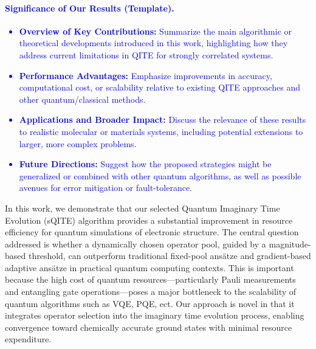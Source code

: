 \documentclass[aip,jcp,amsmath,amssymb, reprint]{revtex4-1}
\newcommand{\note}[2]{%
  \ifthenelse{\boolean{shownotes}}%
    {\textcolor{#1}{#2}}%
    {}%
}
\begin{document}
\note{blue}{
\paragraph{Significance of Our Results (Template).}
\begin{itemize}
    \item \textbf{Overview of Key Contributions:} Summarize the main algorithmic or theoretical developments introduced in this work, highlighting how they address current limitations in QITE for strongly correlated systems.
    \item \textbf{Performance Advantages:} Emphasize improvements in accuracy, computational cost, or scalability relative to existing QITE approaches and other quantum/classical methods.
    \item \textbf{Applications and Broader Impact:} Discuss the relevance of these results to realistic molecular or materials systems, including potential extensions to larger, more complex problems.
    \item \textbf{Future Directions:} Suggest how the proposed strategies might be generalized or combined with other quantum algorithms, as well as possible avenues for error mitigation or fault-tolerance.
\end{itemize}
}

In this work, we demonstrate that our selected Quantum Imaginary Time Evolution (sQITE) algorithm provides a substantial improvement in resource efficiency for quantum simulations of electronic structure. The central question addressed is whether a dynamically chosen operator pool, guided by a magnitude-based threshold, can outperform traditional fixed-pool ansätze and gradient-based adaptive ansätze in practical quantum computing contexts. This is important because the high cost of quantum resources—particularly Pauli measurements and entangling gate operations—poses a major bottleneck to the scalability of quantum algorithms such as VQE, PQE, ect. Our approach is novel in that it integrates operator selection into the imaginary time evolution process, enabling convergence toward chemically accurate ground states with minimal resource expenditure.
\end{document}
